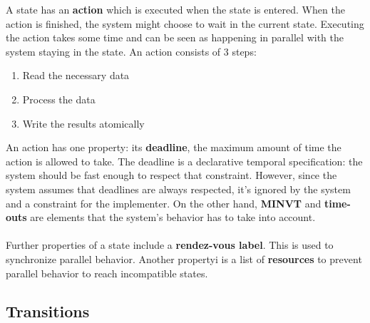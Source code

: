 \documentclass[../main.tex]{subfiles}
\begin{document}
A state has an \textbf{action} which is executed when the state is entered. When the action is finished, the system might choose to wait in the current state.  Executing the action takes some time and can be seen as happening in parallel with the system staying in the state. An action consists of 3 steps:
\begin{enumerate}
	\item Read the necessary data
	\item Process the data
	\item Write the results atomically
\end{enumerate}
An action has one property: its \textbf{deadline}, the maximum amount of time the action is allowed to take. The deadline is a declarative temporal specification: the system should be fast enough to respect that constraint. However, since the system assumes that deadlines are always respected, it's ignored by the system and a constraint for the implementer. On the other hand, \textbf{MINVT} and \textbf{time-outs} are elements that the system's behavior has to take into account.
\\\\
Further properties of a state include a \textbf{rendez-vous label}. This is used to synchronize parallel behavior. Another propertyi is a list of \textbf{resources} to prevent parallel behavior to reach incompatible states.

\subsection{Transitions}
\end{document}

